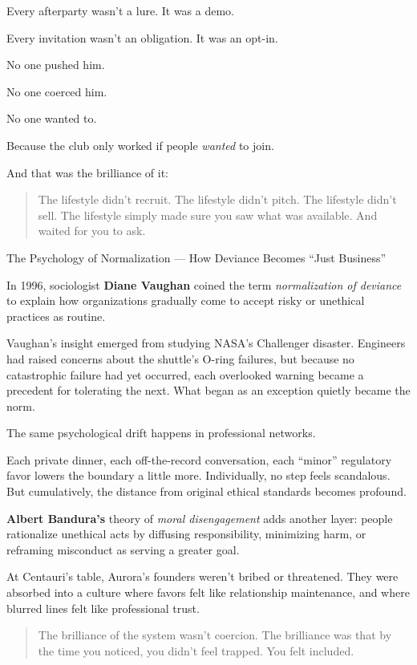 Every afterparty wasn’t a lure. It was a demo.  

Every invitation wasn’t an obligation. It was an opt-in.

No one pushed him. 

No one coerced him. 

No one wanted to. 

Because the club only worked if people \textit{wanted} to join.

And that was the brilliance of it:

\begin{quote}
The lifestyle didn’t recruit.  
The lifestyle didn’t pitch.  
The lifestyle didn’t sell.  
The lifestyle simply made sure you saw what was available.  
And waited for you to ask.
\end{quote}

\begin{PsychologicalSidebar}{The Psychology of Normalization --- How Deviance Becomes ``Just Business''}

  In 1996, sociologist \textbf{Diane Vaughan} coined the term \emph{normalization of deviance} to explain how 
  organizations gradually come to accept risky or unethical practices as routine.

  \medskip
  
  Vaughan’s insight emerged from studying NASA’s Challenger disaster. Engineers had raised concerns about the 
  shuttle’s O-ring failures, but because no catastrophic failure had yet occurred, each overlooked warning became 
  a precedent for tolerating the next. What began as an exception quietly became the norm.

  \medskip
  
  The same psychological drift happens in professional networks.

  \medskip
  
  Each private dinner, each off-the-record conversation, each “minor” regulatory favor lowers the boundary a little more. 
  Individually, no step feels scandalous. But cumulatively, the distance from original ethical standards becomes profound.

  \medskip
  
  \textbf{Albert Bandura’s} theory of \emph{moral disengagement} adds another layer: people rationalize unethical acts by 
  diffusing responsibility, minimizing harm, or reframing misconduct as serving a greater goal.

  \medskip
  
  At Centauri’s table, Aurora’s founders weren’t bribed or threatened. They were absorbed into 
  a culture where favors felt like relationship maintenance, and where blurred lines felt like professional trust.
  
  \begin{quote}
  The brilliance of the system wasn’t coercion.  The brilliance was that by the time you noticed, you didn’t feel trapped.  
  You felt included.
  \end{quote}
  
\end{PsychologicalSidebar}

